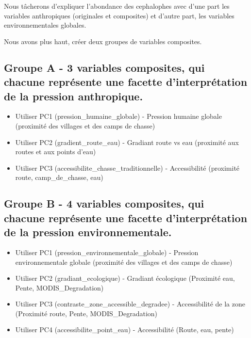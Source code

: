 \documentclass[
]{book}
\providecommand{\tightlist}{%
  \setlength{\itemsep}{0pt}\setlength{\parskip}{0pt}}
\begin{document}
Nous tâcherons d'expliquer l'abondance des cephalophes avec d'une part les variables anthropiques (originales et composites) et d'autre part, les variables environnementales globales.

Nous avons plus haut, créer deux groupes de variables composites.

\subsection{Groupe A - 3 variables composites, qui chacune représente une facette d'interprétation de la pression anthropique.}\label{groupe-a---3-variables-composites-qui-chacune-repruxe9sente-une-facette-dinterpruxe9tation-de-la-pression-anthropique.}

\begin{itemize}
\tightlist
\item
  Utiliser PC1 (pression\_humaine\_globale) - Pression humaine globale (proximité des villages et des camps de chasse)
\item
  Utiliser PC2 (gradient\_route\_eau) - Gradiant route vs eau (proximité aux routes et aux points d'eau)
\item
  Utiliser PC3 (accessibilite\_chasse\_traditionnelle) - Accessibilité (proximité route, camp\_de\_chasse, eau)
\end{itemize}

\subsection{Groupe B - 4 variables composites, qui chacune représente une facette d'interprétation de la pression environnementale.}\label{groupe-b---4-variables-composites-qui-chacune-repruxe9sente-une-facette-dinterpruxe9tation-de-la-pression-environnementale.}

\begin{itemize}
\tightlist
\item
  Utiliser PC1 (pression\_environnementale\_globale) - Pression environnementale globale (proximité des villages et des camps de chasse)
\item
  Utiliser PC2 (gradiant\_ecologique) - Gradiant écologique (Proximité eau, Pente, MODIS\_Degradation)
\item
  Utiliser PC3 (contraste\_zone\_accessible\_degradee) - Accessibilité de la zone (Proximité route, Pente, MODIS\_Degradation)
\item
  Utiliser PC4 (accessibilite\_point\_eau) - Accessibilité (Route, eau, pente)
\end{itemize}
\end{document}
